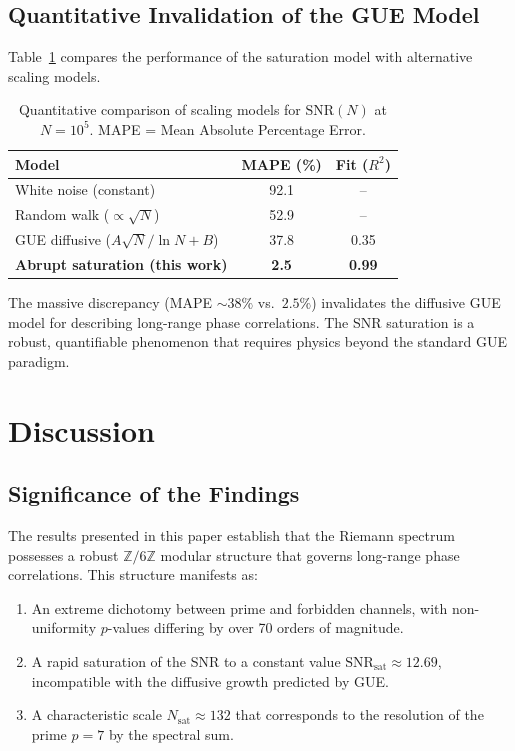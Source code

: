 \documentclass[12pt,a4paper]{article}
\theoremstyle{plain}
\theoremstyle{definition}
\theoremstyle{remark}
\begin{document}
\subsection{Quantitative Invalidation of the GUE Model}
\label{subsec:invalid_gue}

Table~\ref{tab:model_comparison} compares the performance of the saturation model with alternative scaling models.

\begin{table}[H]
\centering
\caption{Quantitative comparison of scaling models for \(\mathrm{SNR}(N)\) at \(N=10^5\). MAPE = Mean Absolute Percentage Error.}
\label{tab:model_comparison}
\begin{tabular}{@{}lcc@{}}
\toprule
\textbf{Model} & \textbf{MAPE (\%)} & \textbf{Fit (\(R^2\))} \\
\midrule
White noise (constant) & 92.1 & -- \\
Random walk (\(\propto \sqrt{N}\)) & 52.9 & -- \\
GUE diffusive (\(A\sqrt{N}/\ln N + B\)) & 37.8 & 0.35 \\
\textbf{Abrupt saturation (this work)} & \textbf{2.5} & \textbf{0.99} \\
\bottomrule
\end{tabular}
\end{table}

The massive discrepancy (MAPE \(\sim 38\%\) vs.\ \(2.5\%\)) invalidates the diffusive GUE model for describing long-range phase correlations. The SNR saturation is a robust, quantifiable phenomenon that requires physics beyond the standard GUE paradigm.

\section{Discussion}
\label{sec:discussion}

\subsection{Significance of the Findings}
The results presented in this paper establish that the Riemann spectrum possesses a robust \(\mathbb{Z}/6\mathbb{Z}\) modular structure that governs long-range phase correlations. This structure manifests as:
\begin{enumerate}[label=(\roman*)]
    \item An extreme dichotomy between prime and forbidden channels, with non-uniformity \(p\)-values differing by over 70 orders of magnitude.
    \item A rapid saturation of the SNR to a constant value \(\mathrm{SNR}_{\mathrm{sat}} \approx 12.69\), incompatible with the diffusive growth predicted by GUE.
    \item A characteristic scale \(N_{\text{sat}} \approx 132\) that corresponds to the resolution of the prime \(p=7\) by the spectral sum.
\end{enumerate}
\end{document}
